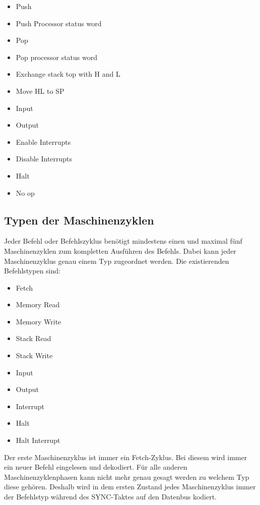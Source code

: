 \documentclass[12pt]{article}
\begin{document}
\begin{multicols}{2}
\begin{itemize}
\item Push
\item Push Processor status word
\item Pop
\item Pop processor status word
\item Exchange stack top with H and L
\item Move HL to SP
\item Input
\item Output
\item Enable Interrupts
\item Disable Interrupts
\item Halt
\item No op
\end{itemize}
\end{multicols}


\subsection{Typen der Maschinenzyklen}
Jeder Befehl oder Befehlszyklus benötigt mindestens einen und maximal fünf Maschinenzyklen zum kompletten Ausführen des Befehls. Dabei kann jeder Maschinenzyklus genau einem Typ zugeordnet werden. Die existierenden Befehlstypen sind:

\begin{itemize}
\item Fetch
\item Memory Read
\item Memory Write
\item Stack Read
\item Stack Write
\item Input
\item Output
\item Interrupt
\item Halt
\item Halt Interrupt
\end{itemize}

\noindent
Der erste Maschinenzyklus ist immer ein Fetch-Zyklus. Bei diesem wird immer ein neuer Befehl eingelesen und dekodiert. Für alle anderen Maschinenzyklenphasen kann nicht mehr genau gesagt werden zu welchem Typ diese gehören. Deshalb wird in dem ersten Zustand jedes Maschinenzyklus immer der Befehlstyp während des SYNC-Taktes auf den Datenbus kodiert. \cite{IntMan18}
\end{document}
